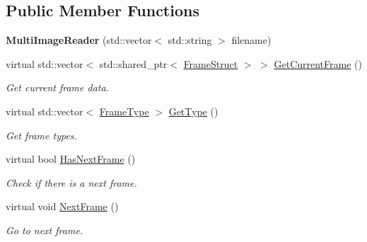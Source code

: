 \subsection*{Public Member Functions}
\begin{DoxyCompactItemize}
\item 
\mbox{\label{classmoetsi_1_1ssp_1_1MultiImageReader_a20a5450c538661d3951ea27a2ff92854}} 
{\bfseries Multi\+Image\+Reader} (std\+::vector$<$ std\+::string $>$ filename)
\item 
\mbox{\label{classmoetsi_1_1ssp_1_1MultiImageReader_a6a0aceb3412f25580876a4fbcedf7ed0}} 
virtual std\+::vector$<$ std\+::shared\+\_\+ptr$<$ \hyperlink{structmoetsi_1_1ssp_1_1FrameStruct}{Frame\+Struct} $>$ $>$ \hyperlink{classmoetsi_1_1ssp_1_1MultiImageReader_a6a0aceb3412f25580876a4fbcedf7ed0}{Get\+Current\+Frame} ()
\begin{DoxyCompactList}\small\item\em Get current frame data. \end{DoxyCompactList}\item 
virtual std\+::vector$<$ \hyperlink{namespacemoetsi_1_1ssp_a46efdfa2cd5a28ead465dcc8006b5a87}{Frame\+Type} $>$ \hyperlink{classmoetsi_1_1ssp_1_1MultiImageReader_ad5f6cf0cfb1e64bcf569ab0bbfcce9d6}{Get\+Type} ()
\begin{DoxyCompactList}\small\item\em Get frame types. \end{DoxyCompactList}\item 
virtual bool \hyperlink{classmoetsi_1_1ssp_1_1MultiImageReader_a04240c98d28d8949fca4ecdcb04f04f5}{Has\+Next\+Frame} ()
\begin{DoxyCompactList}\small\item\em Check if there is a next frame. \end{DoxyCompactList}\item 
\mbox{\label{classmoetsi_1_1ssp_1_1MultiImageReader_a472e2b97ce7a1c2485abd14c276bb8fe}} 
virtual void \hyperlink{classmoetsi_1_1ssp_1_1MultiImageReader_a472e2b97ce7a1c2485abd14c276bb8fe}{Next\+Frame} ()
\begin{DoxyCompactList}\small\item\em Go to next frame. \end{DoxyCompactList}\item 

\end{DoxyCompactItemize}
